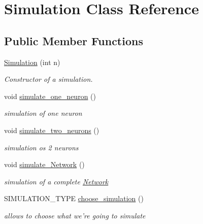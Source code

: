 \hypertarget{classSimulation}{\section{Simulation Class Reference}
\label{classSimulation}
}
\subsection*{Public Member Functions}
\begin{DoxyCompactItemize}
\item 
\hyperlink{classSimulation_a930144ecdcb42d15e2444554c4f60b3f}{Simulation} (int n)
\begin{DoxyCompactList}\small\item\em Constructor of a simulation. \end{DoxyCompactList}\item 
void \hyperlink{classSimulation_a48270844a14fb552bee8d992e75770ea}{simulate\-\_\-one\-\_\-neuron} ()
\begin{DoxyCompactList}\small\item\em simulation of one neuron \end{DoxyCompactList}\item 
void \hyperlink{classSimulation_aa6592e493217c02303339bf80cbda5eb}{simulate\-\_\-two\-\_\-neurons} ()
\begin{DoxyCompactList}\small\item\em simulation os 2 neurons \end{DoxyCompactList}\item 
void \hyperlink{classSimulation_a24255803814c198459a1cc3279657cf1}{simulate\-\_\-\-Network} ()
\begin{DoxyCompactList}\small\item\em simulation of a complete \hyperlink{classNetwork}{Network} \end{DoxyCompactList}\item 
S\-I\-M\-U\-L\-A\-T\-I\-O\-N\-\_\-\-T\-Y\-P\-E \hyperlink{classSimulation_a04733a805552b695cc5366ab1f988a37}{choose\-\_\-simulation} ()
\begin{DoxyCompactList}\small\item\em allows to choose what we're going to simulate \end{DoxyCompactList}\end{DoxyCompactItemize}



